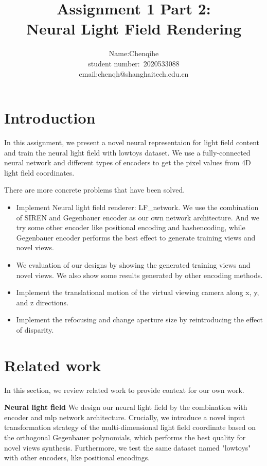 \documentclass[acmtog]{acmart}
\title{Assignment 1 Part 2:\\ {Neural Light Field Rendering}}
\author{Name:\quad Chenqihe  \\ student number:\ 2020533088
\\email:\quad chenqh@shanghaitech.edu.cn}
\begin{document}
\maketitle

\vspace*{2 ex}

\section{Introduction}
	\quad In this assignment, we present a novel neural representaion for light field content and train the neural light field with lowtoys dataset. We use a fully-connected neural network and different types of encoders to get the pixel values from 4D light field coordinates.
	
		\quad There are more concrete problems that have been solved. 
	
	\begin{itemize}
		\item Implement Neural light field renderer: LF\_network. We use the combination of SIREN and Gegenbauer encoder as our own network architecture. And we try some other encoder like positional encoding and hashencoding, while Gegenbauer encoder performs the best effect to generate training views and novel views.
		
		\item We evaluation of our designs by showing the generated training views and novel views. We also show some results generated by other encoding methods.
		
		\item Implement the translational motion of the virtual viewing camera along x, y, and z directions. 
		
		\item Implement the refocusing and change aperture size by reintroducing the effect of disparity.
		
	\end{itemize}

	
\section{Related work}
\qquad In this section, we review related work to provide context for our
own work.

\quad \textbf{Neural light field}
    We design our neural light field by the combination with encoder and mlp network architecture. Crucially, we introduce a novel input transformation strategy of the multi-dimensional light field coordinate based on the orthogonal Gegenbauer polynomials, which performs the best quality for novel views synthesis. Furthermore, we test the same dataset named "lowtoys" with other encoders, like positional encodings. 
\end{document}
